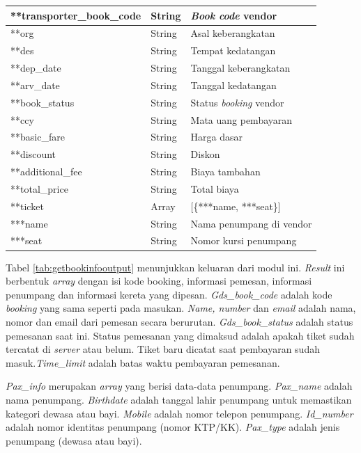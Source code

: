 \begin{table}[H]
\begin{tabular}{|l|l|p{8cm}|}
        \hline
        **transporter\_book\_code & String & \textit{Book code} vendor\\
        \hline
        **org & String & Asal keberangkatan\\
        \hline
        **des & String & Tempat kedatangan\\
        \hline
        **dep\_date & String & Tanggal keberangkatan\\
        \hline
        **arv\_date & String & Tanggal kedatangan\\
        \hline
        **book\_status & String & Status \textit{booking} vendor\\
        \hline
        **ccy & String & Mata uang pembayaran\\
        \hline
        **basic\_fare & String & Harga dasar\\
        \hline
        **discount & String & Diskon\\
        \hline
        **additional\_fee & String & Biaya tambahan\\
        \hline
        **total\_price & String & Total biaya\\
        \hline
        **ticket & Array & [\{***name, ***seat\}]\\
        \hline
        ***name & String & Nama penumpang di vendor\\
        \hline
        ***seat & String & Nomor kursi penumpang\\
        \hline
		
	\end{tabular} 
\end{table}

Tabel \ref{tab:getbookinfooutput} menunjukkan keluaran dari modul ini. \textit{Result} ini berbentuk \textit{array} dengan isi kode booking, informasi pemesan, informasi penumpang dan informasi kereta yang dipesan. \textit{Gds\_book\_code} adalah kode \textit{booking} yang sama seperti pada masukan. \textit{Name, number} dan \textit{email} adalah nama, nomor dan email dari pemesan secara berurutan. \textit{Gds\_book\_status} adalah status pemesanan saat ini. Status pemesanan yang dimaksud adalah apakah tiket sudah tercatat di \textit{server} atau belum. Tiket baru dicatat saat pembayaran sudah masuk.\textit{Time\_limit} adalah batas waktu pembayaran pemesanan.

\textit{Pax\_info} merupakan \textit{array} yang berisi data-data penumpang. \textit{Pax\_name} adalah nama penumpang. \textit{Birthdate} adalah tanggal lahir penumpang untuk memastikan kategori dewasa atau bayi. \textit{Mobile} adalah nomor telepon penumpang. \textit{Id\_number} adalah nomor identitas penumpang (nomor KTP/KK). \textit{Pax\_type} adalah jenis penumpang (dewasa atau bayi).

